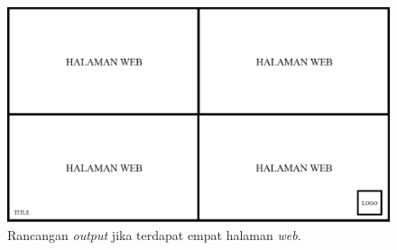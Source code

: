 \begin{figure}[H]
	\centering
		\includegraphics[scale=0.3]{Gambar/output_4.png}
	\caption{Rancangan \textit{output} jika terdapat empat halaman \textit{web}.}
	\label{fig:output4}
\end{figure}
